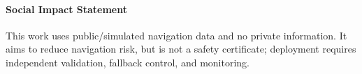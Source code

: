 \documentclass{article}
\theoremstyle{definition}
\begin{document}
\paragraph{Social Impact Statement}
This work uses public/simulated navigation data and no private information. It
aims to reduce navigation risk, but is not a safety certificate; deployment
requires independent validation, fallback control, and monitoring.













\newpage
\appendix




\clearpage

\end{document}
